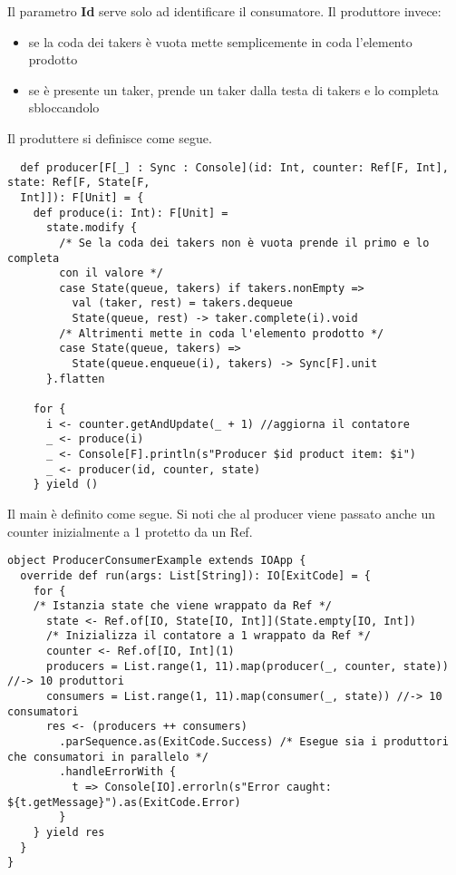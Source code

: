 \noindent Il parametro \textbf{Id} serve solo ad identificare il consumatore. Il produttore invece: 
\begin{itemize}
    \item se la coda dei takers è vuota mette semplicemente in coda l’elemento prodotto 
    \item se è presente un taker, prende un taker dalla testa di takers e lo completa sbloccandolo
\end{itemize}
\noindent Il produttere si definisce come segue.
\begin{verbatim}
  def producer[F[_] : Sync : Console](id: Int, counter: Ref[F, Int], state: Ref[F, State[F,
  Int]]): F[Unit] = {
    def produce(i: Int): F[Unit] =
      state.modify {
        /* Se la coda dei takers non è vuota prende il primo e lo completa
        con il valore */
        case State(queue, takers) if takers.nonEmpty => 
          val (taker, rest) = takers.dequeue
          State(queue, rest) -> taker.complete(i).void
        /* Altrimenti mette in coda l'elemento prodotto */ 
        case State(queue, takers) => 
          State(queue.enqueue(i), takers) -> Sync[F].unit
      }.flatten

    for {
      i <- counter.getAndUpdate(_ + 1) //aggiorna il contatore
      _ <- produce(i)
      _ <- Console[F].println(s"Producer $id product item: $i")
      _ <- producer(id, counter, state)
    } yield ()    
\end{verbatim}

\noindent Il main è definito come segue.  Si noti che al producer viene passato anche un counter inizialmente a 1 protetto da un Ref.

\begin{verbatim}
object ProducerConsumerExample extends IOApp {
  override def run(args: List[String]): IO[ExitCode] = {
    for {
    /* Istanzia state che viene wrappato da Ref */
      state <- Ref.of[IO, State[IO, Int]](State.empty[IO, Int])
      /* Inizializza il contatore a 1 wrappato da Ref */
      counter <- Ref.of[IO, Int](1)
      producers = List.range(1, 11).map(producer(_, counter, state)) //-> 10 produttori
      consumers = List.range(1, 11).map(consumer(_, state)) //-> 10 consumatori
      res <- (producers ++ consumers)
        .parSequence.as(ExitCode.Success) /* Esegue sia i produttori che consumatori in parallelo */
        .handleErrorWith {
          t => Console[IO].errorln(s"Error caught: ${t.getMessage}").as(ExitCode.Error)
        }
    } yield res
  }
}
\end{verbatim}


